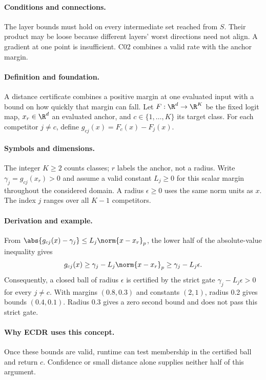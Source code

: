\paragraph{Conditions and connections.}
The layer bounds must hold on every intermediate set reached from $S$. Their product may be loose because different layers' worst directions need not align. A gradient at one point is insufficient. C02 combines a valid rate with the anchor margin.

\paragraph{Definition and foundation.}
A distance certificate combines a positive margin at one evaluated input with a bound on how quickly that margin can fall. Let $F:\R^d\to\R^K$ be the fixed logit map, $x_r\in\R^d$ an evaluated anchor, and $c\in\{1,\ldots,K\}$ its target class. For each competitor $j\ne c$, define $g_{cj}(x)=F_c(x)-F_j(x)$.
\paragraph{Symbols and dimensions.}
The integer $K\ge2$ counts classes; $r$ labels the anchor, not a radius. Write $\gamma_j=g_{cj}(x_r)>0$ and assume a valid constant $L_j\ge0$ for this scalar margin throughout the considered domain. A radius $\epsilon\ge0$ uses the same norm units as $x$. The index $j$ ranges over all $K-1$ competitors.
\paragraph{Derivation and example.}
From $\abs{g_{cj}(x)-\gamma_j}\le L_j\norm{x-x_r}_p$, the lower half of the absolute-value inequality gives
\[
 g_{cj}(x)\ge\gamma_j-L_j\norm{x-x_r}_p
 \ge\gamma_j-L_j\epsilon.
\]
Consequently, a closed ball of radius $\epsilon$ is certified by the strict gate $\gamma_j-L_j\epsilon>0$ for every $j\ne c$. With margins $(0.8,0.3)$ and constants $(2,1)$, radius 0.2 gives bounds $(0.4,0.1)$. Radius 0.3 gives a zero second bound and does not pass this strict gate.
\paragraph{Why ECDR uses this concept.}
Once these bounds are valid, runtime can test membership in the certified ball and return $c$. Confidence or small distance alone supplies neither half of this argument.
